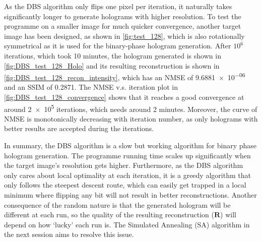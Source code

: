 As the DBS algorithm only flips one pixel per iteration, it naturally takes significantly longer to generate holograms with higher resolution. To test the programme on a smaller image for much quicker convergence, another target image has been designed, as shown in \cref{fig:test_128}, which is also rotationally symmetrical as it is used for the binary-phase hologram generation. After $10^6$ iterations, which took 10 minutes, the hologram generated is shown in \cref{fig:DBS_test_128_Holo} and its resulting reconstruction is shown in \cref{fig:DBS_test_128_recon_intensity}, which has an NMSE of \num{9.6881e-06} and an SSIM of 0.2871. The NMSE v.s. iteration plot in \cref{fig:DBS_test_128_convergence} shows that it reaches a good convergence at around \num{2e5} iterations, which needs around 2 minutes. Moreover, the curve of NMSE is monotonically decreasing with iteration number, as only holograms with better results are accepted during the iterations.

In summary, the DBS algorithm is a slow but working algorithm for binary phase hologram generation. The programme running time scales up significantly when the target image's resolution gets higher. Furthermore, as the DBS algorithm only cares about local optimality at each iteration, it is a greedy algorithm that only follows the steepest descent route, which can easily get trapped in a local minimum where flipping any bit will not result in better reconstructions. Another consequence of the random nature is that the generated hologram will be different at each run, so the quality of the resulting reconstruction ($\textbf{R}$) will depend on how `lucky' each run is. The Simulated Annealing (SA) algorithm \cite{Kirkpatrick1983} in the next session aims to resolve this issue.


